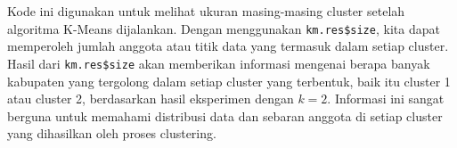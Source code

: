 \documentclass[
  oneside]{book}
\newenvironment{Shaded}{\begin{snugshade}}{\end{snugshade}}
\newcommand{\CommentTok}[1]{\textcolor[rgb]{0.56,0.35,0.01}{\textit{#1}}}
\newcommand{\NormalTok}[1]{#1}
\newcommand{\SpecialCharTok}[1]{\textcolor[rgb]{0.81,0.36,0.00}{\textbf{#1}}}
\begin{document}
\begin{Shaded}
\end{Shaded}

Kode ini digunakan untuk melihat ukuran masing-masing cluster setelah algoritma K-Means dijalankan. Dengan menggunakan \texttt{km.res\$size}, kita dapat memperoleh jumlah anggota atau titik data yang termasuk dalam setiap cluster. Hasil dari \texttt{km.res\$size} akan memberikan informasi mengenai berapa banyak kabupaten yang tergolong dalam setiap cluster yang terbentuk, baik itu cluster 1 atau cluster 2, berdasarkan hasil eksperimen dengan \(k=2\). Informasi ini sangat berguna untuk memahami distribusi data dan sebaran anggota di setiap cluster yang dihasilkan oleh proses clustering.

\begin{Shaded}
\end{Shaded}
\end{document}
